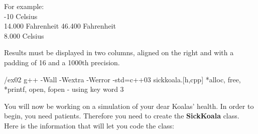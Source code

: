For example:\\
{
  -10 Celsius\\
	14.000       Fahrenheit
}
{
  46.400 Fahrenheit\\
	8.000	     Celsius
}

Results must be displayed in two columns, aligned on the right and with a padding
of 16 and a 1000th precision.

\newpage

\printCPPExerciseFormalities
{/ex02}
{g++ -Wall -Wextra -Werror -std=c++03}
{sickkoala.[h,cpp]}
{*alloc, free, *printf, open, fopen - using key word}
{3}

You will now be working on a simulation of your dear Koalas' health. In order to begin, you need patients. Therefore you need to create the \textbf{SickKoala} class.\\
Here is the information that will let you code the class:

